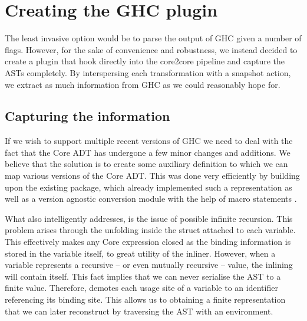 %     
% 
%     
%   
%   
% 

\section{Creating the GHC plugin}

The least invasive option would be to parse the output of GHC given a number of  flags. However, for the sake
of convenience and robustness, we instead decided to create a plugin that hook directly into the core2core pipeline and
capture the ASTs completely. By interspersing each transformation with a snapshot action, we extract as much information
from GHC as we could reasonably hope for.

\subsection{Capturing the information}
\label{section:methods:capturing_info}

If we wish to support multiple recent versions of GHC we need to deal with the fact that the Core ADT has undergone
a few minor changes and additions. We believe that the solution is to create some auxiliary definition to which we can
map various versions of the Core ADT. This was done very efficiently by building upon the existing  package,
which already implemented such a representation as well as a version agnostic conversion module with the help of 
macro statements \cite{ghc_dump}. 

What  also intelligently addresses, is the issue of possible infinite recursion.
This problem arises through the unfolding inside the  struct attached to each variable. This effectively
makes any Core expression closed as the binding information is stored in the variable itself, to great utility of the inliner.
However, when a variable represents a recursive --
or even mutually recursive -- value, the inlining will contain itself. This fact implies that we can never serialise 
the AST to a finite value. Therefore,  demotes each usage site of a variable to an identifier referencing its binding site.
This allows us to obtaining a finite representation that we can later reconstruct by traversing
the AST with an environment.

